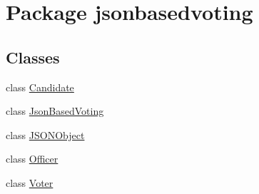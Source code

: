 \hypertarget{namespacejsonbasedvoting}{}\section{Package jsonbasedvoting}
\label{namespacejsonbasedvoting}
\subsection*{Classes}
\begin{DoxyCompactItemize}
\item 
class \mbox{\hyperlink{classjsonbasedvoting_1_1_candidate}{Candidate}}
\item 
class \mbox{\hyperlink{classjsonbasedvoting_1_1_json_based_voting}{Json\+Based\+Voting}}
\item 
class \mbox{\hyperlink{classjsonbasedvoting_1_1_j_s_o_n_object}{J\+S\+O\+N\+Object}}
\item 
class \mbox{\hyperlink{classjsonbasedvoting_1_1_officer}{Officer}}
\item 
class \mbox{\hyperlink{classjsonbasedvoting_1_1_voter}{Voter}}
\end{DoxyCompactItemize}
